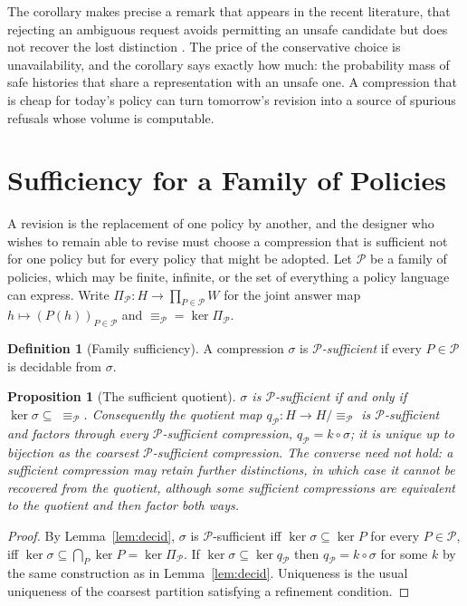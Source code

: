 \documentclass[11pt]{article}
\newtheorem{proposition}{Proposition}
\theoremstyle{definition}
\newtheorem{definition}{Definition}
\theoremstyle{remark}
\newcommand{\Hist}{H}
\newcommand{\Pol}{\mathcal{P}}
\newcommand{\eqv}[1]{\equiv_{#1}}
\begin{document}
The corollary makes precise a remark that appears in the recent literature, that rejecting an ambiguous request avoids permitting an unsafe candidate but does not recover the lost distinction \cite{agenticrv}. The price of the conservative choice is unavailability, and the corollary says exactly how much: the probability mass of safe histories that share a representation with an unsafe one. A compression that is cheap for today's policy can turn tomorrow's revision into a source of spurious refusals whose volume is computable.

\section{Sufficiency for a Family of Policies}\label{sec:family}

A revision is the replacement of one policy by another, and the designer who wishes to remain able to revise must choose a compression that is sufficient not for one policy but for every policy that might be adopted. Let $\Pol$ be a family of policies, which may be finite, infinite, or the set of everything a policy language can express. Write $\Pi_\Pol:\Hist\to \prod_{P\in\Pol}W$ for the joint answer map $h\mapsto (P(h))_{P\in\Pol}$ and $\eqv{\Pol}=\ker\Pi_\Pol$.

\begin{definition}[Family sufficiency]
A compression $\sigma$ is \emph{$\Pol$-sufficient} if every $P\in\Pol$ is decidable from $\sigma$.
\end{definition}

\begin{proposition}[The sufficient quotient]\label{prop:quotient}
$\sigma$ is $\Pol$-sufficient if and only if $\ker\sigma\subseteq\;\eqv{\Pol}$. Consequently the quotient map $q_\Pol:\Hist\to\Hist/{\eqv{\Pol}}$ is $\Pol$-sufficient and factors through every $\Pol$-sufficient compression, $q_\Pol=k\circ\sigma$; it is unique up to bijection as the coarsest $\Pol$-sufficient compression. The converse need not hold: a sufficient compression may retain further distinctions, in which case it cannot be recovered from the quotient, although some sufficient compressions are equivalent to the quotient and then factor both ways.
\end{proposition}

\begin{proof}
By Lemma~\ref{lem:decid}, $\sigma$ is $\Pol$-sufficient iff $\ker\sigma\subseteq\ker P$ for every $P\in\Pol$, iff $\ker\sigma\subseteq\bigcap_{P}\ker P=\ker\Pi_\Pol$. If $\ker\sigma\subseteq\ker q_\Pol$ then $q_\Pol=k\circ\sigma$ for some $k$ by the same construction as in Lemma~\ref{lem:decid}. Uniqueness is the usual uniqueness of the coarsest partition satisfying a refinement condition.
\end{proof}
\end{document}
